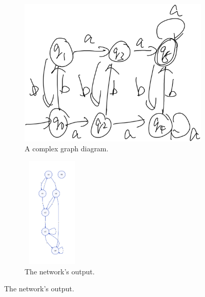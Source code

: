 \documentclass[conference]{IEEEtran}
\begin{document}
\begin{figure}[htbp]
	\begin{subfigure}[b]{0.45\linewidth}
		\includegraphics[width=\linewidth]{ex3.png}
		\caption{A complex graph diagram.}
	\end{subfigure}
	\hfill
	\begin{subfigure}[b]{0.45\linewidth}
		\includegraphics[width=80pt, height=150pt]{ex4.png}
		\caption{The network's output.}
	\end{subfigure}
	
	\vspace{1em}
	

\end{figure}
\end{document}

